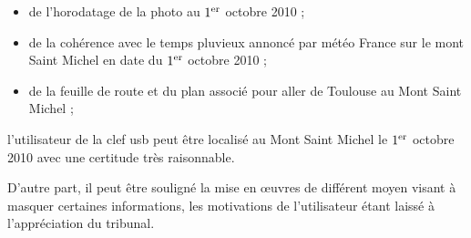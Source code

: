 \documentclass[a4paper,11pt]{article}
\begin{document}
\begin{itemize}
    \item de l’horodatage de la photo au $1^{\rm er}$ octobre 2010 ;
    \item de la cohérence avec le temps pluvieux annoncé par météo France sur le
        mont Saint Michel en date du $1^{\rm er}$ octobre 2010 ;
    \item de la feuille de route et du plan associé pour aller de Toulouse au
        Mont Saint Michel ;
\end{itemize}
l’utilisateur de la clef usb peut être localisé au Mont Saint Michel le
$1^{\rm er}$ octobre 2010 avec une certitude très raisonnable.

D’autre part, il peut être souligné la mise en œuvres de différent moyen visant
à masquer certaines informations, les motivations de l’utilisateur
étant laissé à l’appréciation du tribunal.
\end{document}
